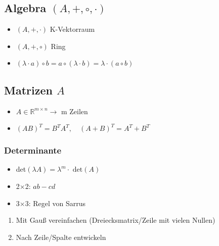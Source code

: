 \documentclass[ngerman,11pt,a4paper
,pdftex]{article}
\newcommand{\f}[1]{$#1$}
\theoremstyle{nodot}
\theoremstyle{nodot}
\begin{document}
\begin{multicols*}{3}
        \begin{tcolorbox}[colback=white,bottom=10pt, top=10pt,breakable,enhanced]
          \subsection*{Algebra \f{(A,+,\circ,\cdot)}}
          \begin{itemize}
            \item \f{(A,+,\cdot)} K-Vektorraum
            \item \f{(A,+,\circ)} Ring
            \item \f{(\lambda\cdot a)\circ b = a\circ (\lambda \cdot b) = \lambda \cdot (a\circ b)}
          \end{itemize}
        \end{tcolorbox}

        \begin{tcolorbox}[colback=white]
          \subsection*{Matrizen \f{A}}
          \begin{itemize}
            \item \f{A\in\mathbb{R}^{m\times n}\rightarrow} m Zeilen
            \item \f{(AB)^T=B^TA^T,\quad (A+B)^T=A^T+B^T}
          \end{itemize}

          \subsubsection*{Determinante}
          \begin{itemize}
            \item det\f{(\lambda A)=\lambda^m\cdot \text{ det}(A)}
            \item 2\f{\times}2: \f{ab-cd}
            \item 3\f{\times}3: Regel von Sarrus
          \end{itemize}
          \begin{enumerate}
            \item Mit Gauß vereinfachen (Dreiecksmatrix/Zeile mit vielen Nullen)
            \item Nach Zeile/Spalte entwickeln
          \end{enumerate}


\end{tcolorbox}
\end{multicols*}
\end{document}
